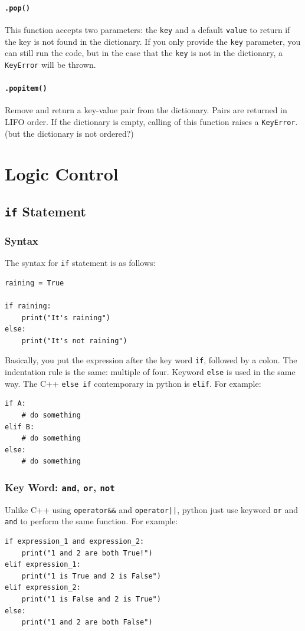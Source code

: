 \documentclass[12pt]{book}
\begin{document}
\subsubsection{\texttt{.pop()}}
\label{sec:orgf426ae9}
This function accepts two parameters: the \texttt{key} and a default \texttt{value} to return if the key is not found in the dictionary. If you only provide the \texttt{key} parameter, you can still run the code, but in the case that the \texttt{key} is not in the dictionary, a \texttt{KeyError} will be thrown.
\subsubsection{\texttt{.popitem()}}
\label{sec:orgde88da4}
Remove and return a key-value pair from the dictionary. Pairs are returned in LIFO order. If the dictionary is empty, calling of this function raises a \texttt{KeyError}. (but the dictionary is not ordered?)

\chapter{Logic Control}
\label{sec:org8693fcd}
\section{\texttt{if} Statement}
\label{sec:orgfa8b8bb}
\subsection{Syntax}
\label{sec:orgad0bcda}
The syntax for \texttt{if} statement is as follows:
\begin{verbatim}
raining = True

if raining:
    print("It's raining")
else:
    print("It's not raining")
\end{verbatim}
Basically, you put the expression after the key word \texttt{if}, followed by a colon. The indentation rule is the same: multiple of four. Keyword \texttt{else} is used in the same way. The C++ \texttt{else if} contemporary in python is \texttt{elif}. For example:
\begin{verbatim}
if A:
    # do something
elif B:
    # do something
else:
    # do something
\end{verbatim}
\subsection{Key Word: \texttt{and}, \texttt{or}, \texttt{not}}
\label{sec:orge95ebb3}
Unlike C++ using \texttt{operator\&\&} and \texttt{operator||}, python just use keyword \texttt{or} and \texttt{and} to perform the same function. For example:
\begin{verbatim}
if expression_1 and expression_2:
    print("1 and 2 are both True!")
elif expression_1:
    print("1 is True and 2 is False")
elif expression_2:
    print("1 is False and 2 is True")
else:
    print("1 and 2 are both False")
\end{verbatim}
\end{document}
